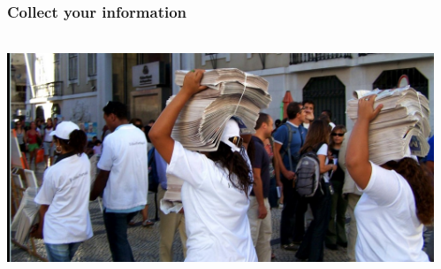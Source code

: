 \documentclass{beamer}
\begin{document}
\begin{frame}

    \frametitle{Collect your information}

 \begin{columns}
 \begin{column}{0.34\textwidth}
    \includegraphics[height=6.5cm]{pics/information.jpg}
 \end{column}
 \begin{column}{0.90\textwidth}
 \end{column}
\end{columns}


\end{frame}
\end{document}
